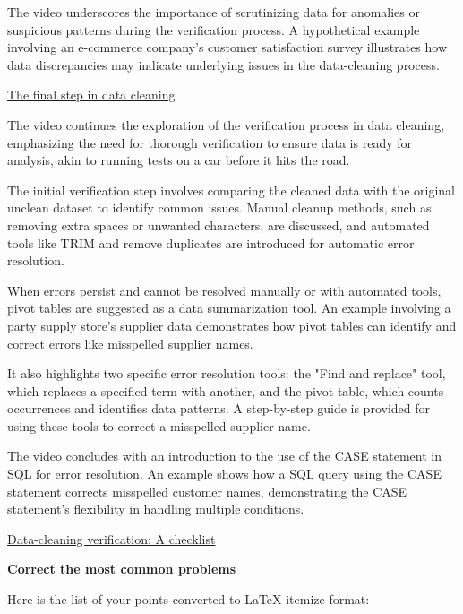 \documentclass[]{article}
\begin{document}
The video underscores the importance of scrutinizing data for anomalies or suspicious patterns during the verification process. A hypothetical example involving an e-commerce company's customer satisfaction survey illustrates how data discrepancies may indicate underlying issues in the data-cleaning process.

\uline{The final step in data cleaning}

The video continues the exploration of the verification process in data cleaning, emphasizing the need for thorough verification to ensure data is ready for analysis, akin to running tests on a car before it hits the road.

The initial verification step involves comparing the cleaned data with the original unclean dataset to identify common issues. Manual cleanup methods, such as removing extra spaces or unwanted characters, are discussed, and automated tools like TRIM and remove duplicates are introduced for automatic error resolution.

When errors persist and cannot be resolved manually or with automated tools, pivot tables are suggested as a data summarization tool. An example involving a party supply store's supplier data demonstrates how pivot tables can identify and correct errors like misspelled supplier names.

It also highlights two specific error resolution tools: the "Find and replace" tool, which replaces a specified term with another, and the pivot table, which counts occurrences and identifies data patterns. A step-by-step guide is provided for using these tools to correct a misspelled supplier name.

The video concludes with an introduction to the use of the CASE statement in SQL for error resolution. An example shows how a SQL query using the CASE statement corrects misspelled customer names, demonstrating the CASE statement's flexibility in handling multiple conditions.

\uline{Data-cleaning verification: A checklist}

\textbf{Correct the most common problems}

Here is the list of your points converted to LaTeX itemize format:
\end{document}
